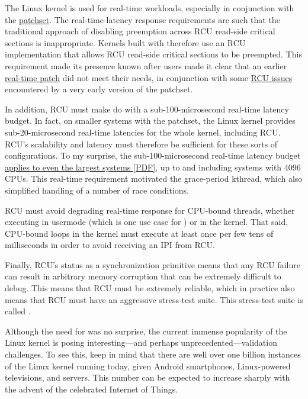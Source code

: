 The Linux kernel is used for real-time workloads, especially in
conjunction with the
\href{https://wiki.linuxfoundation.org/realtime/}{ patchset}.
The
real-time-latency response requirements are such that the traditional
approach of disabling preemption across RCU read-side critical sections
is inappropriate.
Kernels built with  therefore use
an RCU implementation that allows RCU read-side critical sections to be
preempted.
This requirement made its presence known after users made it
clear that an earlier
\href{https://lwn.net/Articles/107930/}{real-time patch}
did not meet their needs, in
conjunction with some
\href{https://lore.kernel.org/r/20050318002026.GA2693@us.ibm.com}{RCU issues}
encountered by a very early version of the  patchset.

In addition, RCU must make do with a sub-100-microsecond real-time
latency budget.
In fact, on smaller systems with the  patchset, the
Linux kernel provides sub-20-microsecond real-time latencies for the
whole kernel, including RCU\@.
RCU's scalability and latency must
therefore be sufficient for these sorts of configurations.
To my
surprise, the sub-100-microsecond real-time latency budget
\href{http://www.rdrop.com/users/paulmck/realtime/paper/bigrt.2013.01.31a.LCA.pdf}{applies to even the largest systems [PDF]},
up to and including systems with 4096 CPUs.
This real-time requirement
motivated the grace-period kthread, which also simplified handling of a
number of race conditions.

RCU must avoid degrading real-time response for CPU-bound threads,
whether executing in usermode (which is one use case for
) or in the kernel.
That said, CPU-bound loops in
the kernel must execute  at least once per few tens of
milliseconds in order to avoid receiving an IPI from RCU\@.

Finally, RCU's status as a synchronization primitive means that any RCU
failure can result in arbitrary memory corruption that can be extremely
difficult to debug.
This means that RCU must be extremely reliable,
which in practice also means that RCU must have an aggressive
stress-test suite.
This stress-test suite is called .

Although the need for  was no surprise, the current
immense popularity of the Linux kernel is posing interesting---and perhaps
unprecedented---validation challenges.
To see this, keep in mind that
there are well over one billion instances of the Linux kernel running
today, given Android smartphones, Linux-powered televisions, and
servers.
This number can be expected to increase sharply with the advent
of the celebrated Internet of Things.

